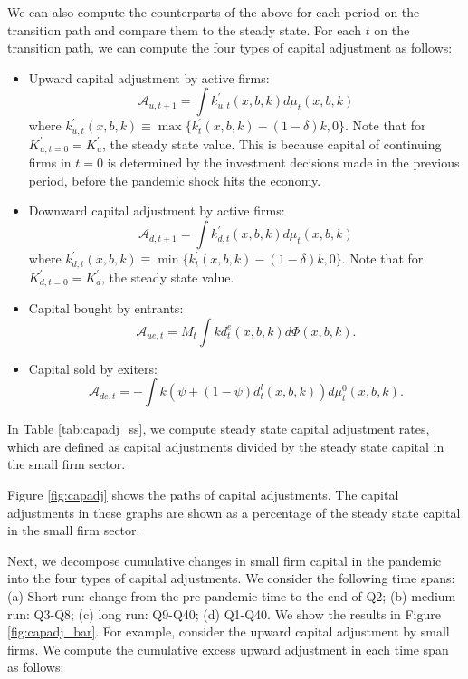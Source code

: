 \documentclass[11pt,english]{article}
\begin{document}
We can also compute the counterparts of the above for each period on the
transition path and compare them to the steady state. For each $t$ on the transition path, we can compute the four types of capital adjustment as follows:

\begin{itemize}
\item Upward capital adjustment by active firms: 
\begin{equation*}
\mathcal{A}_{u,t+1} = \int k^{\prime }_{u,t}(x,b,k) d\mu_{t}(x,b,k)
\end{equation*}
where $k^{\prime }_{u,t}(x,b,k) \equiv \max \{k^{\prime }_t(x,b,k)-(1-\delta)k,0 \}$. Note that for $K^{\prime }_{u,t=0} = K^{\prime }_{u}$, the steady state value. This is because capital of continuing firms in $t=0$ is determined by the investment decisions made in the previous period, before the pandemic shock hits the economy.

\item Downward capital adjustment by active firms: 
\begin{equation*}
\mathcal{A}_{d,t+1} = \int k^{\prime }_{d,t}(x,b,k) d\mu_{t}(x,b,k)
\end{equation*}
where $k^{\prime }_{d,t}(x,b,k) \equiv \min \{k^{\prime }_t(x,b,k)-(1-\delta)k,0 \}$. Note that for $K^{\prime }_{d,t=0} = K^{\prime }_{d}$, the steady state value.

\item Capital bought by entrants: 
\begin{equation*}
\mathcal{A}_{ue,t} = M_t \int k d^e_t(x,b,k) d\Phi(x,b,k).
\end{equation*}

\item Capital sold by exiters: 
\begin{equation*}
\mathcal{A}_{de,t} = -\int k (\psi + (1-\psi)d^l_t(x,b,k)) d\mu^0_t(x,b,k).
\end{equation*}

\end{itemize}

In Table \ref{tab:capadj_ss}, we compute steady state capital adjustment rates, which are defined as capital adjustments divided by the steady state capital in the small firm sector. 

Figure \ref{fig:capadj} shows the paths of capital adjustments. The capital adjustments in these graphs are shown as a percentage of the steady state capital in the small firm sector. 

Next, we decompose cumulative changes in small firm capital in the pandemic into the four types of capital adjustments. We consider the following time spans: (a) Short run: change from the pre-pandemic time to the end of Q2; (b) medium run: Q3-Q8; (c) long run: Q9-Q40; (d) Q1-Q40. We show the results in Figure \ref{fig:capadj_bar}. 
For example, consider the upward capital adjustment by small firms. We compute the cumulative excess upward adjustment in each time span as follows:
\end{document}
